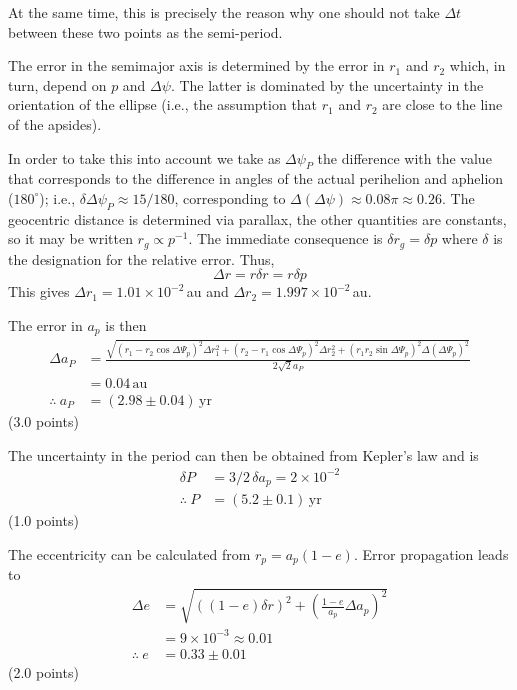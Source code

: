 \begin{description}
\begin{description}
    At the same time, this is precisely the reason why one should not take
    $\Delta t$ between these two points as the semi-period.
  \end{description}

\item[(c)] The error in the semimajor axis is determined by the error in $r_1$
  and $r_2$ which, in turn, depend on $p$ and $\Delta\psi$. The latter is
  dominated by the uncertainty in the orientation of the ellipse (i.e., the
  assumption that $r_1$ and $r_2$ are close to the line of the apsides).

  In order to take this into account we take as $\Delta\psi_P$ the difference
  with the value that corresponds to the difference in angles of the actual
  perihelion and aphelion ($180^\circ$); i.e.,
  $\delta\Delta\psi_P \approx 15/180$, corresponding to
  $\Delta(\Delta\psi) \approx 0.08\pi \approx 0.26$. The geocentric distance
  is determined via parallax, the other quantities are constants, so it may be
  written $r_g \propto p^{-1}$. The immediate consequence is
  $\delta r_g = \delta p$ where $\delta$ is the designation for the relative
  error. Thus,
  \[
    \Delta r = r\delta r = r\delta p
  \]
  This gives $\Delta r_1 = 1.01\times10^{-2}$\,au and
  $\Delta r_2 = 1.997\times10^{-2}$\,au.

  The error in $a_p$ is then
  \begin{align*}
    \Delta a_P &= \frac{\sqrt{(r_1 - r_2\cos\Delta\Psi_p)^2\Delta r_1^2
      + (r_2 - r_1\cos\Delta\Psi_p)^2\Delta r_2^2
      + (r_1 r_2\sin\Delta\Psi_p)^2\Delta(\Delta\Psi_p)^2}}{2\sqrt{2}a_P} \\
      &= 0.04\,\mathrm{au} \\
    \therefore\ a_P &= (2.98\pm0.04)\,\mathrm{yr} %
  \end{align*}
  \hfill(3.0 points)

  The uncertainty in the period can then be obtained from Kepler's law and is
  \begin{align*}
    \delta P &= 3/2\,\delta a_p = 2\times10^{-2} \\
    \therefore\ P &= (5.2\pm0.1)\,\mathrm{yr}
  \end{align*}
  \hfill(1.0 points)

  The eccentricity can be calculated from $r_p = a_p(1 - e)$. Error
  propagation leads to
  \begin{align*}
    \Delta e &= \sqrt{\left((1 - e)\delta r\right)^2
      + \left(\frac{1 - e}{a_p}\Delta a_p\right)^2} \\
      &= 9\times10^{-3} \approx 0.01 \\
    \therefore\ e &= 0.33\pm0.01
  \end{align*}
  \hfill(2.0 points)
\end{description}
